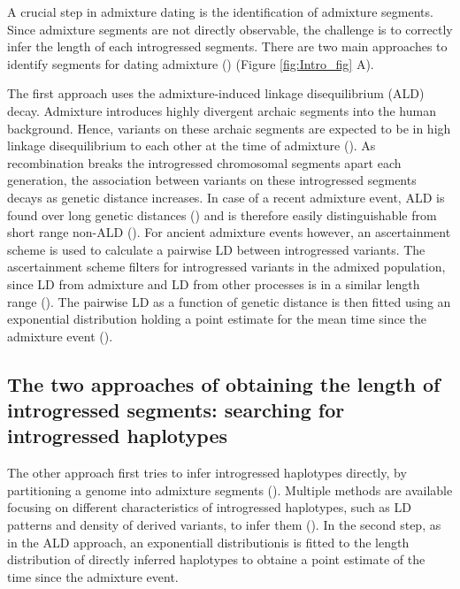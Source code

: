 \documentclass[]{article}
\begin{document}
A crucial step in admixture dating is the identification of admixture
segments. Since admixture segments are not directly observable, the
challenge is to correctly infer the length of each introgressed segments.
There are two main approaches to identify segments for dating admixture
(\cite{chimusa_dating_2018}) (Figure \ref{fig:Intro_fig} A).

The first approach uses the admixture-induced linkage disequilibrium
(ALD) decay. Admixture introduces highly divergent archaic segments into
the human background. Hence, variants on these archaic segments are
expected to be in high linkage disequilibrium to each other at the time
of admixture
(\cite{chakraborty_admixture_1988,stephens_mapping_1994,wall_detecting_2000}).
As recombination breaks the introgressed chromosomal segments apart each
generation, the association between variants on these introgressed
segments decays as genetic distance increases. In case of a recent
admixture event, ALD is found over long genetic distances
(\cite{patterson_methods_2004}) and is therefore easily distinguishable
from short range non-ALD (\cite{moorjani_history_2011}). For ancient
admixture events however, an ascertainment scheme is used to calculate a
pairwise LD between introgressed variants. The ascertainment scheme
filters for introgressed variants in the admixed population, since LD
from admixture and LD from other processes is in a similar length range
(\cite{sankararaman_date_2012}). The pairwise LD as a function of
genetic distance is then fitted using an exponential distribution
holding a point estimate for the mean time since the admixture event
(\cite{moorjani_history_2011,loh_inferring_2013}).

\subsection{The two approaches of obtaining the length of introgressed
segments: searching for introgressed
haplotypes}\label{the-two-approaches-of-obtaining-the-length-of-introgressed-segments-searching-for-introgressed-haplotypes}

The other approach first tries to infer introgressed haplotypes
directly, by partitioning a genome into admixture segments
(\cite{gravel_population_2012,price_sensitive_2009,lawson_inference_2012}).
Multiple methods are available focusing on different characteristics of
introgressed haplotypes, such as LD patterns and density of derived
variants, to infer them
(\cite{lawson_inference_2012,racimo_signatures_2017,seguin_orlando_paleogenomics_2014,vernot_excavating_2016,sankararaman_combined_2016,skov_detecting_2018}).
In the second step, as in the ALD approach, an exponentiall
distributionis is fitted to the length distribution of directly inferred
haplotypes to obtaine a point estimate of the time since the admixture
event.
\end{document}
